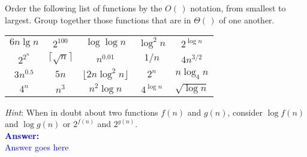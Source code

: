 \item{}
Order the following list of functions by the $O(\,)$ notation, from smallest to
largest. Group together those functions that are in $\Theta(\,)$ of one another.
\\[12pt]
\begin{tabular}{ccccc}
    $6n\lg n$ & $2^{100}$ & $\log\log n$ & $\log^2n$ & $2^{\log n}$\\[6pt]
    $2^{2^n}$ & $\lceil\sqrt n\rceil$ & $n^{0.01}$ & $1/n$ & $4n^{3/2}$\\[6pt]
    $3n^{0.5}$ & $5n$ & $\lfloor2n\log^2n\rfloor$ & $2^n$ & $n\log_4n$\\[6pt]
    $4^n$ & $n^3$ & $n^2\log n$ & $4^{\log n}$ & $\sqrt{\log n}$\\[6pt]
\end{tabular}
\vskip12pt
\emph{Hint}\/: When in doubt about two functions $f(n)$ and $g(n)$, consider
$\log f(n)$ and $\log g(n)$ or $2^{f(n)}$ and $2^{g(n)}$.\\[12pt]
\ifanswers
\textcolor{blue}{
\textbf{Answer:}\\[6pt]
Answer goes here
}
\newpage
\fi
